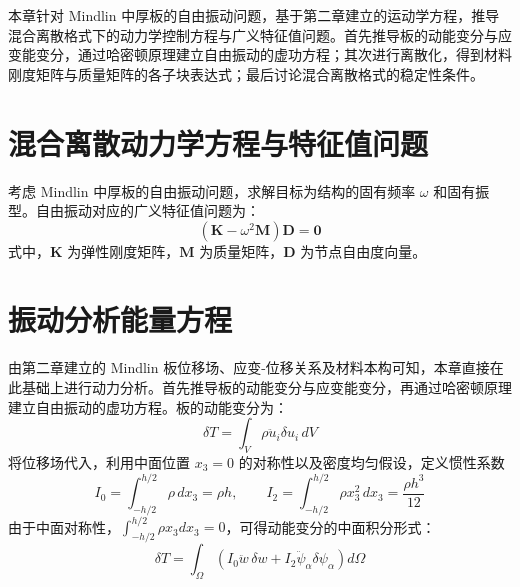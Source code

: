 
本章针对 Mindlin 中厚板的自由振动问题，基于第二章建立的运动学方程，推导混合离散格式下的动力学控制方程与广义特征值问题。首先推导板的动能变分与应变能变分，通过哈密顿原理建立自由振动的虚功方程；其次进行离散化，得到材料刚度矩阵与质量矩阵的各子块表达式；最后讨论混合离散格式的稳定性条件。

\section{混合离散动力学方程与特征值问题}

考虑 Mindlin 中厚板的自由振动问题，求解目标为结构的固有频率 $\omega$ 和固有振型。自由振动对应的广义特征值问题为：
\begin{equation}
(\mathbf{K} - \omega^2 \mathbf{M})\mathbf{D} = \mathbf{0}
\end{equation}
式中，$\mathbf{K}$ 为弹性刚度矩阵，$\mathbf{M}$ 为质量矩阵，$\mathbf{D}$ 为节点自由度向量。

\section{振动分析能量方程}

由第二章建立的 Mindlin 板位移场、应变-位移关系及材料本构可知，本章直接在此基础上进行动力分析。首先推导板的动能变分与应变能变分，再通过哈密顿原理建立自由振动的虚功方程。板的动能变分为：
\begin{equation}
\delta T = \int_V \rho \ddot{u}_i \delta u_i\, dV
\end{equation}
将位移场代入，利用中面位置 $x_3=0$ 的对称性以及密度均匀假设，定义惯性系数
\begin{equation}
I_0 = \int_{-h/2}^{h/2} \rho\, dx_3 = \rho h, \qquad I_2 = \int_{-h/2}^{h/2} \rho x_3^2\, dx_3 = \frac{\rho h^3}{12}
\end{equation}
由于中面对称性，$\int_{-h/2}^{h/2} \rho x_3 dx_3 = 0$，可得动能变分的中面积分形式：
\begin{equation}
\delta T = \int_\Omega \left(I_0 \ddot{w}\,\delta w + I_2 \ddot{\psi}_\alpha \delta\psi_\alpha\right) d\Omega
\end{equation}

